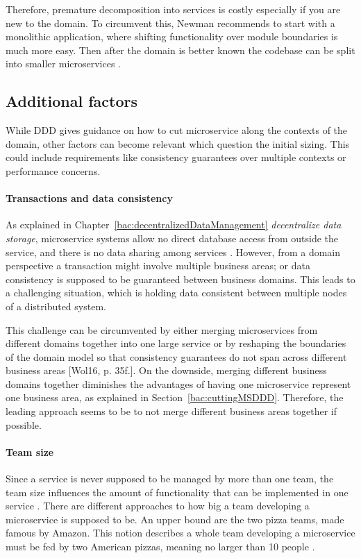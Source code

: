 Therefore, premature decomposition into services is costly especially if you are new to the domain.
To circumvent this, Newman recommends to start with a monolithic application, where shifting functionality over module boundaries is much more easy.
Then after the domain is better known the codebase can be split into smaller microservices \citep[p. 34]{Newman2015}.

\subsection{Additional factors}
\label{bac:addFactors}
While \ac{DDD} gives guidance on how to cut microservice along the contexts of the domain, other factors can become relevant which question the initial sizing.
This could include requirements like consistency guarantees over multiple contexts or performance concerns.

\paragraph{Transactions and data consistency}
As explained in Chapter~\ref{bac:decentralizedDataManagement} \textit{decentralize data storage}, microservice systems allow no direct database access from outside the service, and there is no data sharing among services \citep[p. 36]{Wolff2016}.
However, from a domain perspective a transaction might involve multiple business areas; or data consistency is supposed to be guaranteed between business domains.
This leads to a challenging situation, which is holding data consistent between multiple nodes of a distributed system.

This challenge can be circumvented by either merging microservices from different domains together into one large service or by reshaping the boundaries of the domain model so that consistency guarantees do not span across different business areas [Wol16, p. 35f.].
On the downside, merging different business domains together diminishes the advantages of having one microservice represent one business area, as explained in Section~\ref{bac:cuttingMSDDD}.
Therefore, the leading approach seems to be to not merge different business areas together if possible.

\paragraph{Team size}
Since a service is never supposed to be managed by more than one team, the team size influences the amount of functionality that can be implemented in one service \citep[p. 34]{Wolff2016}.
There are different approaches to how big a team developing a microservice is supposed to be.
An upper bound are the two pizza teams, made famous by Amazon.
This notion describes a whole team developing a microservice must be fed by two American pizzas, meaning no larger than 10 people
\cite{FowlerHowBigIsAMicroservice2014}.

